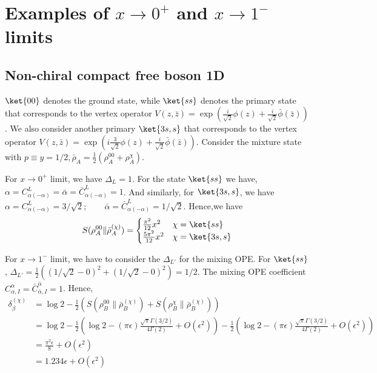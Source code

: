 \documentclass[11pt]{article}
\newcommand{\ep}{\epsilon}
\newcommand{\lb}{\left(}
\newcommand{\rb}{\right)}
\begin{document}
\section{\texorpdfstring{Examples of $x\to 0^+$ and $x\to 1^-$ limits}
{Examples of x->0+ and x->1- limits}}

\subsection{Non-chiral compact free boson 1D}
$\ket{00}$ denotes the ground state, while $\ket{ss}$ denotes the primary state that corresponds to the vertex operator $V(z,\bar z) = \exp \lb \frac{i}{\sqrt{2}}\phi(z) + \frac{i}{\sqrt{2}}\bar \phi(\bar z) \rb$. We also consider another primary $\ket{3s,s}$ that corresponds to the vertex operator $V(z,\bar z) = \exp \lb i\frac{3}{\sqrt{2}}\phi(z) + \frac{i}{\sqrt{2}}\bar \phi(\bar z) \rb$.
Consider the mixture state with $p\equiv y=1/2, \bar \rho_A = \frac{1}{2}\lb \rho_A^{00} + \rho_A^\chi \rb$. 

For $x \to 0^+$ limit, we have $\Delta_L =1$. For the state $\ket{ss}$ we have,  $\alpha = C_{\alpha (-\alpha)}^L =  \bar \alpha = \bar C _{\alpha(- \alpha)}^L = 1 $. And similarly, for $\ket{3s,s}$, we have  $\alpha = C_{\alpha (-\alpha)}^L = 3/\sqrt{2}; \qquad  \bar \alpha = \bar C _{\alpha(- \alpha)}^L = 1/\sqrt{2} $. Hence,we have
\begin{align}
    S(\rho_A^{00}\| \bar \rho_A^{(\chi)}) = \begin{cases}
        \frac{\pi^2}{12} x^2 & \chi = \ket{ss} \\
        \frac{5\pi^2 }{12}x^2 & \chi = \ket{3s,s}
    \end{cases}
\end{align}

For $x \to 1^-$ limit, we have to consider the $\Delta_{L'}$ for the mixing OPE. For $\ket{ss}$, $\Delta_{L'} = \frac{1}{2}\lb \lb 1/\sqrt{2} -0\rb^2 + \lb 1/\sqrt{2} -0\rb^2 \rb= 1/2$. The mixing OPE coefficient $C_{\alpha ,I}^\alpha = \bar C_{\bar \alpha, I}^{\bar \alpha} = 1$. Hence, 
\begin{align}
    \delta_\beta^{(\chi)} &= \log 2 - \frac{1}{2}\lb S(\rho_B^{00} \| \bar \rho^{(\chi)}_B  ) + S(\rho^\chi_B \| \bar \rho ^{(\chi)}_B)   \rb  \\&= \log 2 - \frac{1}{2}\lb \log 2 - (\pi \ep) \frac{\sqrt{\pi} \Gamma(3/2)}{4\Gamma(2)} + O(\ep^2)\rb - \frac{1}{2}\lb  \log 2 - (\pi \ep) \frac{\sqrt{\pi} \Gamma(3/2)}{4\Gamma(2)}+ O(\ep^2)\rb \\
    &= \frac{\pi^2\ep}{8} + O(\ep^2)\\
    &= 1.234 \ep+ O(\ep^2) 
\end{align}
\end{document}
